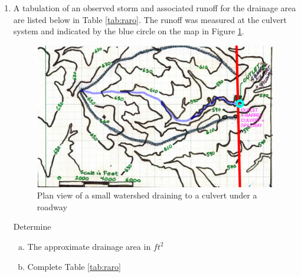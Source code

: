 \documentclass[12pt]{article}
\begin{document}
\begin{enumerate}
The forest portion has a flow path length of 360 feet, at an average slope of 0.01 (1\%) until it reaches the residential portion whose path length is 430 feet, at an average slope of 0.005 (0.5\%). 

\begin{enumerate}[a)]
\item Determine the composite CN value for the watershed.\\
~\\
~\\
~\\
~\\
\item Estimate the time of concentration for the entire watershed using the NRCS-Upland method (Gupta pp. 718-720).\\
~\\
~\\
~\\
~\\
\end{enumerate}
\clearpage
\item A tabulation of an observed storm and associated runoff for the drainage area are listed below in Table \ref{tab:raro}. The runoff was measured at the culvert system and indicated by the blue circle on the map in Figure \ref{fig:culvert}.

\begin{figure}[h!] %
   \centering
   \includegraphics[width=6in]{topoMap.png} 
   \caption{Plan view of a small watershed draining to a culvert under a roadway}
   \label{fig:culvert}
\end{figure}


Determine

\begin{enumerate}[a)]
\item The approximate drainage area in $ft^2$ \clearpage
\item Complete Table \ref{tab:raro}



\end{enumerate}
\end{enumerate}
\end{document}
